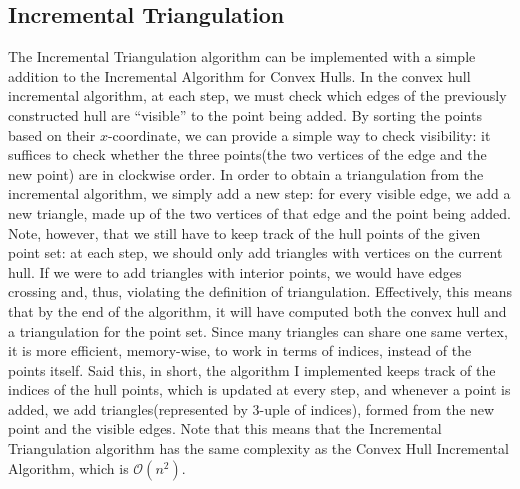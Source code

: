 \documentclass[a4paper, 10pt, conference]{ieeeconf}      %
\begin{document}
\subsection{Incremental Triangulation}
The Incremental Triangulation algorithm can be implemented with a simple addition to the Incremental Algorithm for Convex Hulls.
In the convex hull incremental algorithm, at each step, we must check which edges of the previously constructed hull are ``visible'' to the point being added.
By sorting the points based on their $x$-coordinate, we can provide a simple way to check visibility: it suffices to check whether the three points(the two vertices of the edge and the new point) are in clockwise order.
In order to obtain a triangulation from the incremental algorithm, we simply add a new step: for every visible edge, we add a new triangle, made up of the two vertices of that edge and the point being added.
Note, however, that we still have to keep track of the hull points of the given point set: at each step, we should only add triangles with vertices on the current hull.
If we were to add triangles with interior points, we would have edges crossing and, thus, violating the definition of triangulation.
Effectively, this means that by the end of the algorithm, it will have computed both the convex hull and a triangulation for the point set.
Since many triangles can share one same vertex, it is more efficient, memory-wise, to work in terms of indices, instead of the points itself.
Said this, in short, the algorithm I implemented keeps track of the indices of the hull points, which is updated at every step, and whenever a point is added, we add triangles(represented by $3$-uple of indices), formed from the new point and the visible edges.
Note that this means that the Incremental Triangulation algorithm has the same complexity as the Convex Hull Incremental Algorithm, which is $\mathcal{O}(n^2)$.
\end{document}

